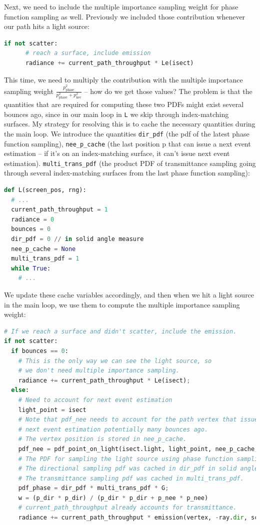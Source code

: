Next, we need to include the multiple importance sampling weight for phase function sampling as well. Previously we included those contribution whenever our path hits a light source:
\begin{lstlisting}[language=python]
    if not scatter:
      # reach a surface, include emission
      radiance += current_path_throughput * Le(isect)
\end{lstlisting}

This time, we need to multiply the contribution with the multiple importance sampling weight $\frac{p_{\text{phase}}^2}{p_{\text{phase}}^2 + p_{\text{nee}}^2}$ -- how do we get those values? The problem is that the quantities that are required for computing these two PDFs might exist several bounces ago, since in our main loop in \lstinline{L} we skip through index-matching surfaces. My strategy for resolving this is to cache the necessary quantities during the main loop. We introduce the quantities \lstinline{dir_pdf} (the pdf of the latest phase function sampling), \lstinline{nee_p_cache} (the last position p that can issue a next event estimation -- if it's on an index-matching surface, it can't issue next event estimation). \lstinline{multi_trans_pdf} (the product PDF of transmittance sampling going through several index-matching surfaces from the last phase function sampling):
\begin{lstlisting}[language=python]
def L(screen_pos, rng):
  # ...
  current_path_throughput = 1
  radiance = 0
  bounces = 0
  dir_pdf = 0 // in solid angle measure
  nee_p_cache = None
  multi_trans_pdf = 1
  while True:
    # ...
\end{lstlisting}

We update these cache variables accordingly, and then when we hit a light source in the main loop, we use them to
compute the multiple importance sampling weight:
\begin{lstlisting}[language=python]
# If we reach a surface and didn't scatter, include the emission.
if not scatter:
  if bounces == 0:
    # This is the only way we can see the light source, so
    # we don't need multiple importance sampling.
    radiance += current_path_throughput * Le(isect);
  else:
    # Need to account for next event estimation
    light_point = isect
    # Note that pdf_nee needs to account for the path vertex that issued
    # next event estimation potentially many bounces ago.
    # The vertex position is stored in nee_p_cache.
    pdf_nee = pdf_point_on_light(isect.light, light_point, nee_p_cache, scene)
    # The PDF for sampling the light source using phase function sampling + transmittance sampling
    # The directional sampling pdf was cached in dir_pdf in solid angle measure.
    # The transmittance sampling pdf was cached in multi_trans_pdf.
    pdf_phase = dir_pdf * multi_trans_pdf * G;
    w = (p_dir * p_dir) / (p_dir * p_dir + p_nee * p_nee)
    # current_path_throughput already accounts for transmittance.
    radiance += current_path_throughput * emission(vertex, -ray.dir, scene) * w
\end{lstlisting}

